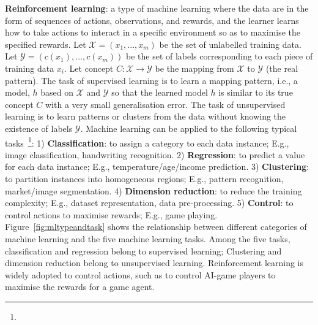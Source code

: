 \noindent \textbf{Reinforcement learning}: a type of machine learning where the data are in the form of sequences of
actions, observations, and rewards, and the learner learns how to take actions to interact in a specific environment so as to maximise the specified rewards. 
Let $\mathcal{X}=(x_1,...,x_m)$ be the set of unlabelled training data.
Let $\mathcal{Y}=(c(x_1),...,c(x_m))$ be the set of labels corresponding to each piece of training data $x_i$.
Let concept $C: \mathcal{X}\rightarrow \mathcal{Y}$ be the mapping from $\mathcal{X}$ to $\mathcal{Y}$ (the real pattern).
The task of supervised learning is to learn a mapping pattern, i.e., a model, $h$ based on $\mathcal{X}$ and $\mathcal{Y}$ so that the learned model $h$ is similar to its true concept $C$ with a very small generalisation error. 
The task of unsupervised learning is to learn patterns or clusters from the data without knowing the existence of labels $\mathcal{Y}$.
Machine learning can be applied to the following typical tasks~\footnote{}:
1) \textbf{Classification}: to assign a category to each data instance; E.g., image classification, handwriting recognition.
2) \textbf{Regression}: to predict a value for each data instance; 
E.g., temperature/age/income prediction.
3) \textbf{Clustering}: to partition instances into homogeneous regions;
E.g., pattern recognition, market/image segmentation.
4) \textbf{Dimension reduction}: to reduce the training complexity;
E.g., dataset representation, data pre-processing.
5) \textbf{Control}: to control actions to maximise rewards;
E.g., game playing.
Figure~\ref{fig:mltypeandtask} shows the relationship between different categories of machine learning and the five machine learning tasks.
Among the five tasks, classification and regression belong to supervised learning;
Clustering and dimension reduction belong to unsupervised learning.
Reinforcement learning is widely adopted to control actions, such as to control AI-game players to maximise the rewards for a game agent.
